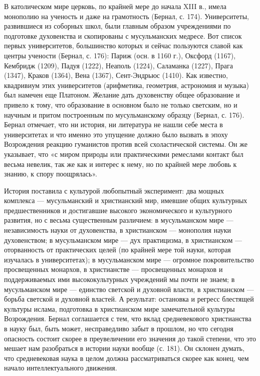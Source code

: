 В католическом мире церковь, по крайней мере до начала XIII в., имела
монополию на ученость и даже на грамотность (Бернал, с. 174).
Университеты, развившиеся из соборных школ, были главным образом
учреждениями по подготовке духовенства и скопированы с мусульманских
медресе. Вот список первых университетов, большинство которых и сейчас
пользуются славой как центры учености (Бернал, с. 176): Париж (осн. в
1160 г.), Оксфорд (1167), Кембридж (1209), Падуя (1222), Неаполь
(1224), Саламанка (1227), Прага (1347), Краков (1364), Вена (1367),
Сент-Эндрьюс (1410). Как известно, квадривиум этих университетов
(арифметика, геометрия, астрономия и музыка) был намечен еще Платоном.
Желание дать духовенству общее образование и привело к тому, что
образование в основном было не только светским, но и научным и притом
построенным по мусульманскому образцу (Бернал, с. 176). Бернал
отмечает, что ни история, ни литература не нашли себе места в
университетах и что именно это упущение должно было вызвать в эпоху
Возрождения реакцию гуманистов против всей схоластической системы. Он
же указывает, что «с миром природы или практическими ремеслами контакт
был весьма невелик, так же как и интерес к нему, но по крайней мере
любовь к знанию, к спору поощрялась».

История поставила с культурой любопытный эксперимент: два мощных
комплекса --- мусульманский и христианский мир, имевшие общих
культурных предшественников и достигавшие высокого экономического и
культурного развития, но с весьма существенным различием: в
мусульманском мире --- независимость науки от духовенства, в
христианском --- монополия науки духовенством; в мусульманском мире
--- дух практицизма, в христианском --- оторванность от практических
целей (по крайней мере той науки, которая изучалась в университетах);
в мусульманском мире --- огромное покровительство просвещенных
монархов, в христианстве --- просвещенных монархов и поддерживаемых
ими высококультурных учреждений мы почти не знаем; в мусульманском
мире --- единство светской и духовной власти, в христианском ---
борьба светской и духовной властей. А результат: остановка и регресс
блестящей культуры ислама, подготовка в христианском мире
замечательной культуры Возрождения. Бернал соглашается с тем, что
вклад средневекового христианства в науку был, быть может,
несправедливо забыт в прошлом, но что сегодня опасность состоит скорее
в преувеличении его значения до такой степени, что это мешает нам
разобраться в истории науки вообще (с. 181). Он склонен думать, что
средневековая наука в целом должна рассматриваться скорее как конец,
чем начало интеллектуального движения.

